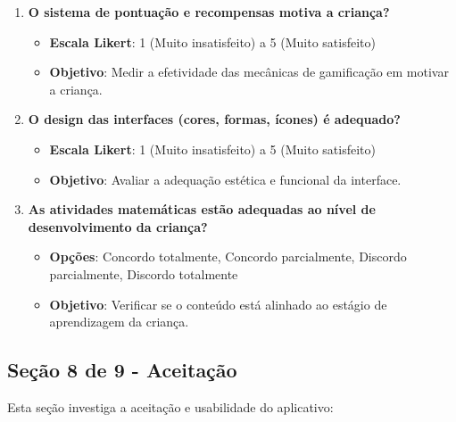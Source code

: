 \begin{enumerate}
    \item \textbf{O sistema de pontuação e recompensas motiva a criança?}
    \begin{itemize}
        \item \textbf{Escala Likert}: 1 (Muito insatisfeito) a 5 (Muito satisfeito)
        \item \textbf{Objetivo}: Medir a efetividade das mecânicas de gamificação em motivar a criança.
    \end{itemize}

    \item \textbf{O design das interfaces (cores, formas, ícones) é adequado?}
    \begin{itemize}
        \item \textbf{Escala Likert}: 1 (Muito insatisfeito) a 5 (Muito satisfeito)
        \item \textbf{Objetivo}: Avaliar a adequação estética e funcional da interface.
    \end{itemize}

    \item \textbf{As atividades matemáticas estão adequadas ao nível de desenvolvimento da criança?}
    \begin{itemize}
        \item \textbf{Opções}: Concordo totalmente, Concordo parcialmente, Discordo parcialmente, Discordo totalmente
        \item \textbf{Objetivo}: Verificar se o conteúdo está alinhado ao estágio de aprendizagem da criança.
    \end{itemize}
\end{enumerate}

\subsection{Seção 8 de 9 - Aceitação}

Esta seção investiga a aceitação e usabilidade do aplicativo:

